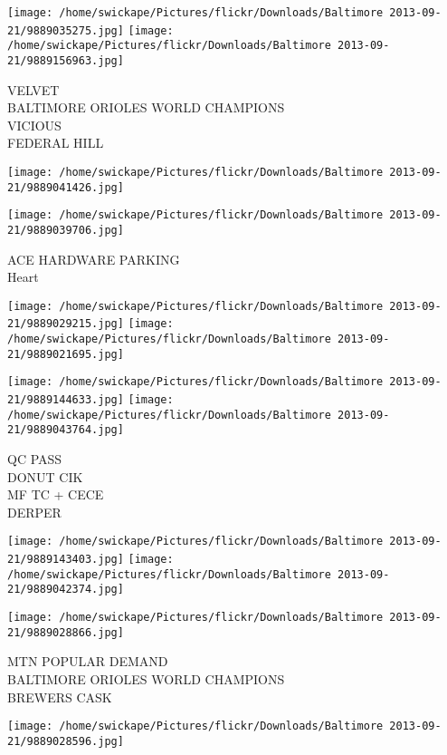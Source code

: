 \documentclass[10pt,letterpaper]{article}
\begin{document}
\texttt{[image: /home/swickape/Pictures/flickr/Downloads/Baltimore 2013-09-21/9889035275.jpg]}
\texttt{[image: /home/swickape/Pictures/flickr/Downloads/Baltimore 2013-09-21/9889156963.jpg]}

VELVET\\
BALTIMORE ORIOLES WORLD CHAMPIONS\\
VICIOUS\\
FEDERAL HILL\\
\pagebreak

\texttt{[image: /home/swickape/Pictures/flickr/Downloads/Baltimore 2013-09-21/9889041426.jpg]}

\vspace{0.25in}
\texttt{[image: /home/swickape/Pictures/flickr/Downloads/Baltimore 2013-09-21/9889039706.jpg]}

ACE HARDWARE PARKING\\
Heart\\
\pagebreak

\texttt{[image: /home/swickape/Pictures/flickr/Downloads/Baltimore 2013-09-21/9889029215.jpg]}
\texttt{[image: /home/swickape/Pictures/flickr/Downloads/Baltimore 2013-09-21/9889021695.jpg]}

\texttt{[image: /home/swickape/Pictures/flickr/Downloads/Baltimore 2013-09-21/9889144633.jpg]}
\texttt{[image: /home/swickape/Pictures/flickr/Downloads/Baltimore 2013-09-21/9889043764.jpg]}

QC PASS\\
DONUT CIK\\
MF TC + CECE\\
DERPER\\
\pagebreak

\texttt{[image: /home/swickape/Pictures/flickr/Downloads/Baltimore 2013-09-21/9889143403.jpg]}
\texttt{[image: /home/swickape/Pictures/flickr/Downloads/Baltimore 2013-09-21/9889042374.jpg]}

\texttt{[image: /home/swickape/Pictures/flickr/Downloads/Baltimore 2013-09-21/9889028866.jpg]}

MTN POPULAR DEMAND\\
BALTIMORE ORIOLES WORLD CHAMPIONS\\
BREWERS CASK\\
\pagebreak

\texttt{[image: /home/swickape/Pictures/flickr/Downloads/Baltimore 2013-09-21/9889028596.jpg]}
\end{document}
